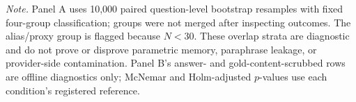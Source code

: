 \begin{table}
\vspace{3pt}
\parbox{0.95\textheight}{\footnotesize\emph{Note.} Panel A uses 10,000 paired question-level bootstrap resamples with fixed four-group classification; groups were not merged after inspecting outcomes. The alias/proxy group is flagged because $N<30$. These overlap strata are diagnostic and do not prove or disprove parametric memory, paraphrase leakage, or provider-side contamination. Panel B's answer- and gold-content-scrubbed rows are offline diagnostics only; McNemar and Holm-adjusted $p$-values use each condition's registered reference.}
\end{table}
